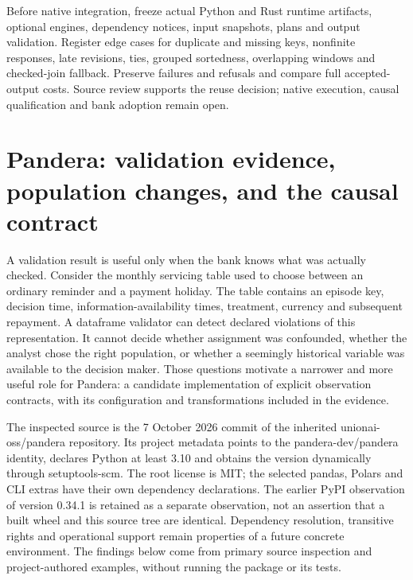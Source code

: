 Before native integration, freeze actual Python and Rust runtime
artifacts, optional engines, dependency notices, input snapshots, plans
and output validation. Register edge cases for duplicate and missing
keys, nonfinite responses, late revisions, ties, grouped sortedness,
overlapping windows and checked-join fallback. Preserve failures and
refusals and compare full accepted-output costs. Source review supports
the reuse decision; native execution, causal qualification and bank
adoption remain open.


\section{Pandera: validation evidence, population changes, and the causal contract}
\label{sec:exec24-pandera}

A validation result is useful only when the bank knows what was actually checked.
Consider the monthly servicing table used to choose between an ordinary reminder
and a payment holiday. The table contains an episode key, decision time,
information-availability times, treatment, currency and subsequent repayment.
A dataframe validator can detect declared violations of this representation.
It cannot decide whether assignment was confounded, whether the analyst chose
the right population, or whether a seemingly historical variable was available
to the decision maker. Those questions motivate a narrower and more useful
role for Pandera: a candidate implementation of explicit observation contracts,
with its configuration and transformations included in the evidence.

The inspected source is the 7 October 2026 commit of the inherited
unionai-oss/pandera repository. Its project metadata points to the
pandera-dev/pandera identity, declares Python at least 3.10 and obtains the
version dynamically through setuptools-scm. The root license is MIT; the
selected pandas, Polars and CLI extras have their own dependency declarations.
The earlier PyPI observation of version 0.34.1 is retained as a separate
observation, not an assertion that a built wheel and this source tree are
identical. Dependency resolution, transitive rights and operational support
remain properties of a future concrete environment. The findings below come
from primary source inspection and project-authored examples, without running
the package or its tests.~\citep{exec24_pandera_source}

